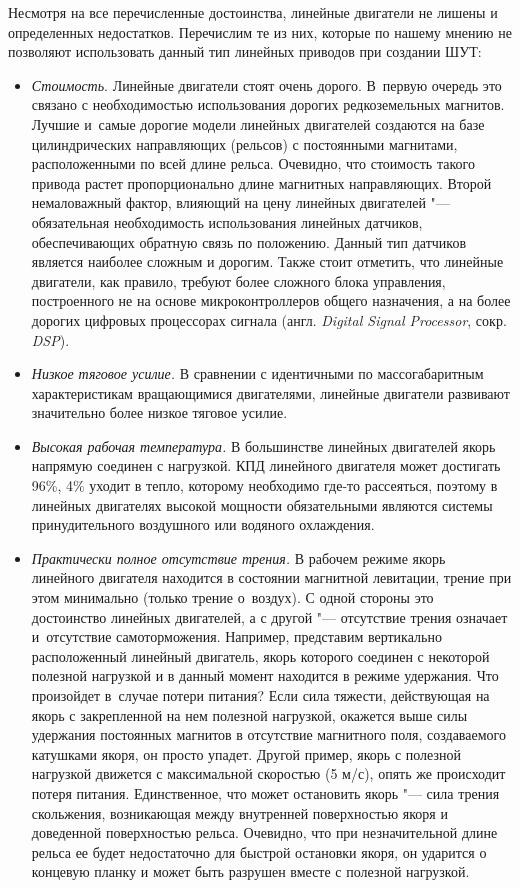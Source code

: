 Несмотря на все перечисленные достоинства, линейные двигатели не лишены и определенных недостатков. Перечислим те из них, которые по нашему мнению не позволяют использовать данный тип линейных приводов при создании ШУТ:

\begin{itemize}
	\item \textit{Стоимость}. Линейные двигатели стоят очень дорого. В~первую очередь это связано с необходимостью использования дорогих редкоземельных магнитов. Лучшие и~самые дорогие модели линейных двигателей создаются на базе цилиндрических направляющих (рельсов) с постоянными магнитами, расположенными по всей длине рельса. Очевидно, что стоимость такого привода растет пропорционально длине магнитных направляющих. Второй немаловажный фактор, влияющий на цену линейных двигателей "--- обязательная необходимость использования линейных датчиков, обеспечивающих обратную связь по положению. Данный тип датчиков является наиболее сложным и дорогим. Также стоит отметить, что линейные двигатели, как правило, требуют более сложного блока управления, построенного не на основе микроконтроллеров общего назначения, а на более дорогих цифровых процессорах сигнала (англ. \textit{Digital Signal Processor}, сокр. \textit{DSP}).
	
	\item \textit{Низкое тяговое усилие.} В сравнении с идентичными по массогабаритным характеристикам вращающимися двигателями, линейные двигатели развивают значительно более низкое тяговое усилие.
	
	\item \textit{Высокая рабочая температура.} В большинстве линейных двигателей якорь напрямую соединен с нагрузкой. КПД линейного двигателя может достигать 96\%, 4\% уходит в тепло, которому необходимо где-то рассеяться, поэтому в линейных двигателях высокой мощности обязательными являются системы принудительного воздушного или водяного охлаждения.
	
	\item \textit{Практически полное отсутствие трения.} В рабочем режиме якорь линейного двигателя находится в состоянии магнитной левитации, трение при этом минимально (только трение о~воздух). С одной стороны это достоинство линейных двигателей, а с другой "--- отсутствие трения означает и~отсутствие самоторможения. Например, представим вертикально расположенный линейный двигатель, якорь которого соединен с некоторой полезной нагрузкой и в данный момент находится в режиме удержания. Что произойдет в~случае потери питания? Если сила тяжести, действующая на якорь с закрепленной на нем полезной нагрузкой, окажется выше силы удержания постоянных магнитов в отсутствие магнитного поля, создаваемого катушками якоря, он просто упадет. Другой пример, якорь с полезной нагрузкой движется с максимальной скоростью (5 м/с), опять же происходит потеря питания. Единственное, что может остановить якорь "--- сила трения скольжения, возникающая между внутренней поверхностью якоря и доведенной поверхностью рельса. Очевидно, что при незначительной длине рельса ее будет недостаточно для быстрой остановки якоря, он ударится о концевую планку и может быть разрушен вместе с полезной нагрузкой.
	

\end{itemize}
